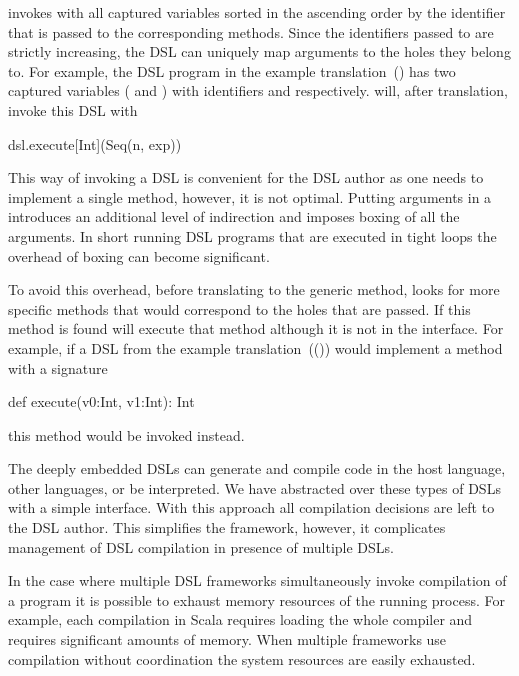 \yy invokes  with all captured variables sorted in the ascending order by the identifier
that is passed to the corresponding  methods. Since the identifiers passed to
 are strictly increasing, the DSL can uniquely map arguments to the holes they belong to. For example, the DSL program in the example translation~() has two captured variables ( and ) with identifiers  and  respectively.
\yy will, after translation, invoke this DSL with\begin{lstparagraph}
dsl.execute[Int](Seq(n, exp))
\end{lstparagraph}

This way of invoking a DSL is convenient for the DSL author as one needs to implement
a single method, however, it is not optimal. Putting arguments in a  introduces an
additional level of indirection and imposes boxing of all the arguments. In short
running DSL programs that are executed in tight loops the overhead of boxing can become
significant.

To avoid this overhead, before translating to the generic  method, \yy looks for
more specific methods that would correspond to the holes that are passed. If this method is found
\yy will execute that method although it is not in the interface. For example, if a DSL from the example
translation~(()) would implement a method with a signature\begin{lstparagraph}
def execute(v0:Int, v1:Int): Int
\end{lstparagraph}
this method would be invoked instead.

The deeply embedded DSLs can generate and compile code in the host language, other languages, or be interpreted. We have
abstracted over these types of DSLs with a simple interface. With this approach
all compilation decisions are left to the DSL author. This simplifies the framework, however, it
complicates management of DSL compilation in presence of multiple DSLs.

In the case where multiple DSL frameworks simultaneously invoke compilation
of a program it is possible to exhaust memory resources of the running process. For example, each
compilation in Scala requires loading the whole compiler and requires significant
amounts of memory. When multiple frameworks use compilation without coordination the
system resources are easily exhausted.

